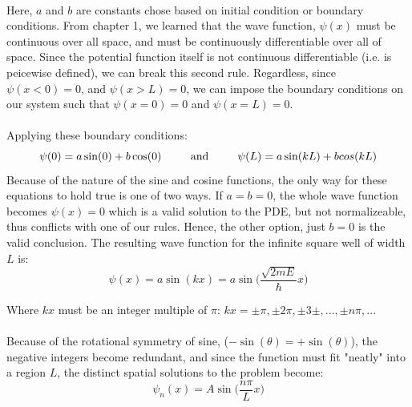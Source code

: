 \documentclass[12pt,letterpaper]{book}
\begin{document}
\paragraph*{}Here, $a$ and $b$ are constants chose based on initial condition or boundary conditions. From chapter 1, we learned that the wave function, 
$\psi(x)$ must be continuous over all space, and must be continuously differentiable over all of space. Since the potential function itself is not continuous differentiable (i.e. is peicewise defined), we can break this second rule. Regardless, since $\psi(x<0) = 0 $, and $\psi(x > L) = 0$, we can impose the boundary conditions on our system such that $\psi(x=0) = 0$ and $\psi(x=L) = 0$.
\paragraph*{}Applying these boundary conditions:
\begin{equation}
\psi(0) = a \sin(0) + b \cos(0) 
\text{\hspace*{8mm} and \hspace*{8mm}}
\psi(L) = a \sin(kL) + b \\cos(kL)
\end{equation}
Because of the nature of the sine and cosine functions, the only way for these equations to hold true is one of two ways. If $a = b = 0$, the whole wave function becomes $\psi(x) = 0$ which is a valid solution to the PDE, but not normalizeable, thus conflicts with one of our rules. Hence, the other option, just $b = 0$ is the valid conclusion. The resulting wave function for the infinite square well of width $L$ is:
\begin{equation}
\psi(x) = a \sin(kx) = a \sin\Big(\frac{\sqrt{2mE}}{\hbar}x\Big)
\end{equation}
\begin{flushright}
Where $kx$ must be an integer multiple of $\pi$: $kx = \pm \pi , \pm 2\pi , \pm 3\pm , ... , \pm n\pi , ...$ 
\end{flushright}
\paragraph*{}Because of the rotational symmetry of sine, ($-\sin(\theta) = +\sin(\theta)$), the negative integers become redundant, and since the function must fit "neatly" into a region $L$, the distinct spatial solutions to the problem become:
\begin{equation}
\label{ISW spatial solution}
\psi_n(x) = A\sin \Big( \frac{n\pi}{L}x \Big)
\end{equation}
\end{document}
